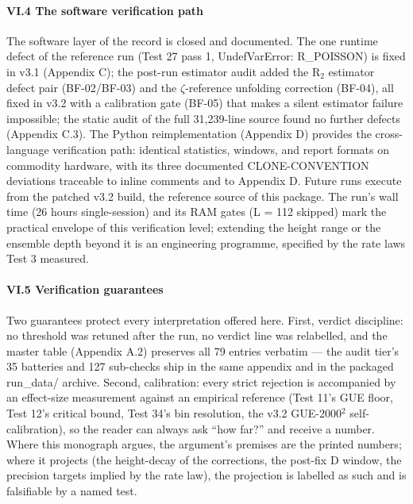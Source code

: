 \documentclass[10pt]{article}
\begin{document}
\paragraph{VI.4 The software verification path}

The software layer of the record is closed and documented. The one runtime defect of the reference run (Test 27 pass 1, UndefVarError: R\_POISSON) is fixed in v3.1 (Appendix C); the post-run estimator audit added the R$_2$ estimator defect pair (BF-02/BF-03) and the $\zeta$-reference unfolding correction (BF-04), all fixed in v3.2 with a calibration gate (BF-05) that makes a silent estimator failure impossible; the static audit of the full 31,239-line source found no further defects (Appendix C.3). The Python reimplementation (Appendix D) provides the cross-language verification path: identical statistics, windows, and report formats on commodity hardware, with its three documented CLONE-CONVENTION deviations traceable to inline comments and to Appendix D. Future runs execute from the patched v3.2 build, the reference source of this package. The run's wall time (26 hours single-session) and its RAM gates (L = 112 skipped) mark the practical envelope of this verification level; extending the height range or the ensemble depth beyond it is an engineering programme, specified by the rate laws Test 3 measured.

\paragraph{VI.5 Verification guarantees}

Two guarantees protect every interpretation offered here. First, verdict discipline: no threshold was retuned after the run, no verdict line was relabelled, and the master table (Appendix A.2) preserves all 79 entries verbatim --- the audit tier's 35 batteries and 127 sub-checks ship in the same appendix and in the packaged run\_data/ archive. Second, calibration: every strict rejection is accompanied by an effect-size measurement against an empirical reference (Test 11's GUE floor, Test 12's critical bound, Test 34's bin resolution, the v3.2 GUE-2000$^2$ self-calibration), so the reader can always ask ``how far?'' and receive a number. Where this monograph argues, the argument's premises are the printed numbers; where it projects (the height-decay of the corrections, the post-fix D window, the precision targets implied by the rate law), the projection is labelled as such and is falsifiable by a named test.
\end{document}
